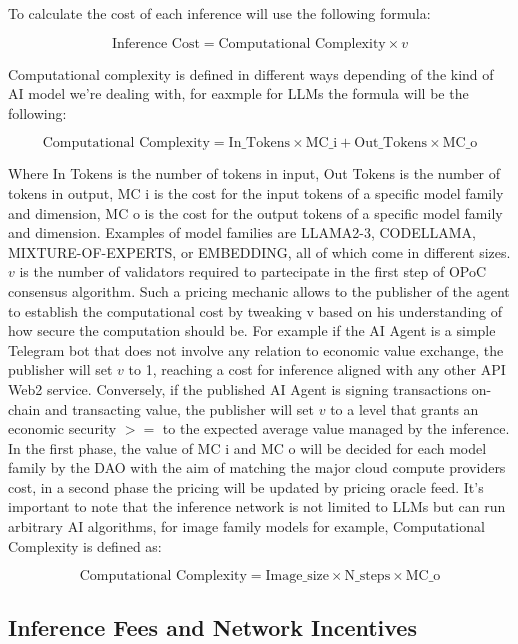 \documentclass{article}
\begin{document}
To calculate the cost of each inference will use the following formula:





\[ \text{Inference Cost} = \text{Computational Complexity} \times v \]



Computational complexity is defined in different ways depending of the kind of AI model we’re dealing with, for eaxmple for LLMs the formula will be the following:

\[\text{Computational Complexity} = \text{In\_Tokens} \times \text{MC\_i} + \text{Out\_Tokens} \times \text{MC\_o} \]


Where In Tokens is the number of tokens in input, Out Tokens is the number of tokens in output, MC i is the cost for the input tokens of a specific model family and dimension, MC o is the cost for the output tokens of a specific model family and dimension.  Examples of model families are LLAMA2-3, CODELLAMA,  MIXTURE-OF-EXPERTS, or EMBEDDING, all of which come in different sizes.  \(v\) is the number of validators required to partecipate in the first step of OPoC consensus algorithm. Such a pricing mechanic allows to the publisher of the agent to establish the computational cost by tweaking v based on his understanding of how secure the computation should be. For example if the AI Agent is a simple Telegram bot that does not involve any relation to economic value exchange, the publisher will set \(v\) to 1, reaching a cost for inference aligned with any other API Web2 service. Conversely, if the published AI Agent is signing transactions on-chain and transacting value, the publisher will set \(v\) to a level that grants an economic security \(>=\) to the expected average value managed by the inference. 
In the first phase, the value of MC i and MC o will be decided for each model family by the DAO with the aim of matching the major cloud compute providers cost, in a second phase the pricing will be updated by pricing oracle feed. It's important to note that the inference network is not limited to LLMs but can run arbitrary AI algorithms, for image family models for example, Computational Complexity is defined as: 

\[\text{Computational Complexity} = \text{Image\_size} \times \text{N\_steps} \times \text{MC\_o} \]

\subsection{Inference Fees and Network Incentives}
\end{document}
